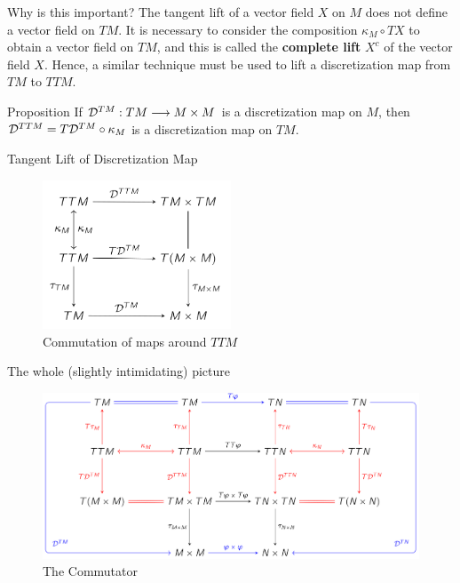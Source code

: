 \documentclass{beamer}
\begin{document}
\begin{frame}{Why is this important?}
  The tangent lift of a vector field $X$ on $M$ does not define a vector field on $TM$. It is necessary to consider the composition $\kappa_M \circ TX$ to obtain a vector field on $TM$, and this is called the \textbf{complete lift} $X^c$ of the vector field $X$. 
  Hence, a similar technique must be used to lift a discretization map from $TM$ to $TTM$.

  \begin{block}{Proposition}
    If $\mathcal{D}^{TM} : TM \longrightarrow M \times M$ is a discretization map on $M$, then $\mathcal{D}^{TTM} = T\mathcal{D}^{TM} \circ \kappa_M$ is a discretization map on $TM$.
  \end{block}
  
\end{frame}

\begin{frame}{Tangent Lift of Discretization Map}
  \begin{figure}[h]
    \centering
    \includegraphics[width=0.5\textwidth]{../Figures/double-tangent.png}
    \caption{Commutation of maps around $TTM$}
  \end{figure}
  
\end{frame}

\begin{frame}{The whole (slightly intimidating) picture}
  \begin{figure}
    \centering
    \includegraphics[width=\textwidth]{../Figures/double-commutator.png}
    \caption{The Commutator}
  \end{figure}
\end{frame}
\end{document}
